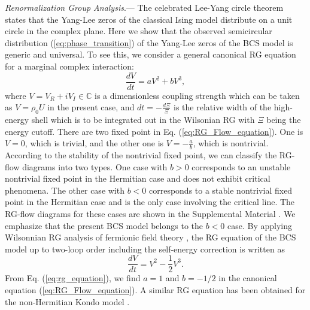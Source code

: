 \documentclass[aps,prl,twocolumn,nofootinbib,superscriptaddress,longbibliography]{revtex4-1}
\begin{document}
	\emph{Renormalization Group Analysis}.--- %
	The celebrated Lee-Yang circle theorem \cite{PhysRev.87.410} states that the Yang-Lee zeros of the classical Ising model distribute on a unit circle in the complex plane. Here we show that the observed semicircular distribution (\ref{eq:phase_transition}) of the Yang-Lee zeros of the BCS model is generic and universal. To see this, we consider a general canonical RG equation for a marginal complex interaction: 
	\begin{equation}
		\frac{dV}{dt}=aV^{2}+bV^{3},\label{eq:RG_Flow_equation}
	\end{equation}
	where $V=V_R+iV_I\in\mathbb{C}$ is a dimensionless coupling strength which can be taken as $V=\rho_0U$ in the present case, and $dt=-\frac{d\Xi}{\Xi}$ is the relative width of the high-energy shell which is to be integrated out in the Wilsonian RG with $\Xi$ being the energy cutoff. There are two fixed point in Eq. (\ref{eq:RG_Flow_equation}). One is $V=0$, which is trivial, and the other one is $V=-\frac{a}{b}$, which is nontrivial. According to the stability of the nontrivial fixed point, we can classify the RG-flow diagrams into two types. %
	One case with $b>0$ corresponds to an unstable nontrivial fixed point in the Hermitian case and does not exhibit critical phenomena. The other case with $b<0$ corresponds to a stable nontrivial fixed point in the Hermitian case and is the only case involving the critical line. The RG-flow diagrams for these cases are shown in the Supplemental Material \cite{SupplementaryMaterial}. We emphasize that the present BCS model belongs to the $b<0$ case. By applying Wilsonnian RG analysis of fermionic field theory \cite{Shankar1994}, the RG equation of the BCS model up to two-loop order including the self-energy correction is written as \cite{SupplementaryMaterial}
	\begin{equation}
		\frac{dV}{dt}=V^{2}-\frac{1}{2}V^{3}.\label{eq:rg_equation}
	\end{equation} 
	 From Eq. (\ref{eq:rg_equation}), we find $a=1$ and $b=-1/2$ in the canonical equation (\ref{eq:RG_Flow_equation}). A similar RG equation has been obtained for the non-Hermitian Kondo model \cite{Nakagawa2018}. %
\end{document}
